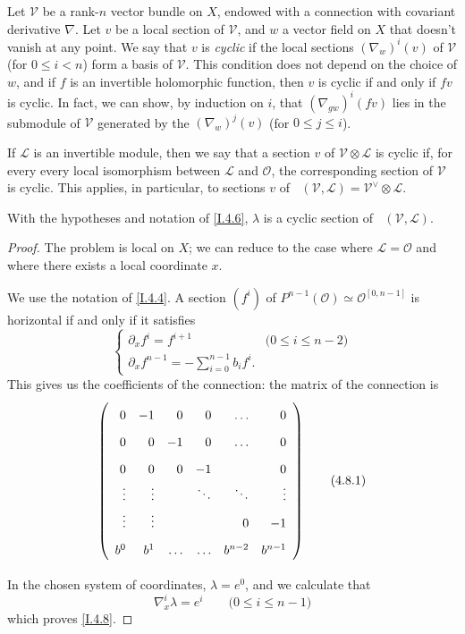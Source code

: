 \documentclass{report}
\theoremstyle{plain}
\newenvironment{lemma}[1]
    {\renewcommand\theinnercustomlemma{#1}\innercustomlemma}
    {\endinnercustomlemma}
\theoremstyle{definition}
\newenvironment{env}[1]
    {\renewcommand\theinnercustomenv{#1}\innercustomenv}
    {\endinnercustomenv}
\newcommand{\sh}{\mathscr}
\renewcommand{\leq}{\leqslant}
\DeclareMathOperator{\shHom}{\underline{Hom}}
\newcommand{\oldpage}[1]{\marginpar{\footnotesize$\Big\vert$ \textit{p.~#1}}}
\begin{document}
\oldpage{26}
\begin{env}{4.7}
\label{I.4.7}
  Let $\sh{V}$ be a rank-$n$ vector bundle on $X$, endowed with a connection with covariant derivative $\nabla$.
  Let $v$ be a local section of $\sh{V}$, and $w$ a vector field on $X$ that doesn't vanish at any point.
  We say that $v$ is \emph{cyclic} if the local sections $(\nabla_w)^i(v)$ of $\sh{V}$ (for $0\leq i<n$) form a basis of $\sh{V}$.
  This condition does not depend on the choice of $w$, and if $f$ is an invertible holomorphic function, then $v$ is cyclic if and only if $fv$ is cyclic.
  In fact, we can show, by induction on $i$, that $(\nabla_{gw})^i(fv)$ lies in the submodule of $\sh{V}$ generated by the $(\nabla_w)^j(v)$ (for $0\leq j\leq i$).

  If $\sh{L}$ is an invertible module, then we say that a section $v$ of $\sh{V}\otimes\sh{L}$ is cyclic if, for every every local isomorphism between $\sh{L}$ and $\sh{O}$, the corresponding section of $\sh{V}$ is cyclic.
  This applies, in particular, to sections $v$ of $\shHom(\sh{V},\sh{L})=\sh{V}^\vee\otimes\sh{L}$.
\end{env}

\begin{lemma}{4.8}
\label{I.4.8}
  With the hypotheses and notation of \cref{I.4.6}, $\lambda$ is a cyclic section of $\shHom(\sh{V},\sh{L})$.
\end{lemma}

\begin{proof}
  The problem is local on $X$;
  we can reduce to the case where $\sh{L}=\sh{O}$ and where there exists a local coordinate $x$.

  We use the notation of \cref{I.4.4}.
  A section $(f^i)$ of $P^{n-1}(\sh{O})\simeq\sh{O}^{[0,n-1]}$ is horizontal if and only if it satisfies
  \[
    \begin{cases}
      \partial_x f^i = f^{i+1}
      & \mbox{($0\leq i\leq n-2$)}
    \\\partial_x f^{n-1} = -\sum_{i=0}^{n-1} b_i f^i.
    \end{cases}
  \]
  This gives us the coefficients of the connection: the matrix of the connection is
  \[
  \label{I.4.8.1}
    \left(
      \def\arraystretch{1.8}
      \begin{array}{rrrrrr}
        0 & -1 & 0 & 0 & \ldots & 0
      \\0 & 0 & -1 & 0 & \ldots & 0
      \\0 & 0 & 0 & -1 & & 0
      \\\vdots & \vdots & & \ddots & \ddots & \vdots
      \\\vdots & \vdots & & & 0 & -1
      \\b^0 & b^1 & \ldots & \ldots & b^{n-2} & b^{n-1}
      \end{array}
    \right)
  \tag{4.8.1}
  \]

\oldpage{27}
  In the chosen system of coordinates, $\lambda=e^0$, and we calculate that
  \[
    \nabla_x^i\lambda = e^i
    \qquad\mbox{($0\leq i\leq n-1$)}
  \]
  which proves \cref{I.4.8}.
\end{proof}
\end{document}
